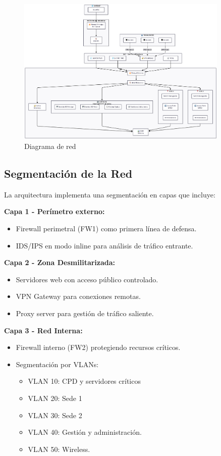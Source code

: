 \documentclass[12pt,letterpaper]{article}
\begin{document}
\begin{figure}[ht]
    \centering
    \includegraphics[width=0.9\textwidth]{./images/diagram.png}
    \caption{Diagrama de red}
    \label{fig:diagrama}
\end{figure}

\subsection{\textcolor{azuloscuro}{Segmentación de la Red}}

La arquitectura implementa una segmentación en capas que incluye:

\noindent\textbf{Capa 1 - Perímetro externo:}
\begin{itemize}
    \item Firewall perimetral (FW1) como primera línea de defensa.
    \item IDS/IPS en modo inline para análisis de tráfico entrante.
\end{itemize}

\noindent\textbf{Capa 2 - Zona Desmilitarizada:}
\begin{itemize}
    \item Servidores web con acceso público controlado.
    \item VPN Gateway para conexiones remotas.
    \item Proxy server para gestión de tráfico saliente.
\end{itemize}

\noindent\textbf{Capa 3 - Red Interna:}
\begin{itemize}
    \item Firewall interno (FW2) protegiendo recursos críticos.
    \item Segmentación por VLANs:
    \begin{itemize}
        \item VLAN 10: CPD y servidores críticos
        \item VLAN 20: Sede 1
        \item VLAN 30: Sede 2
        \item VLAN 40: Gestión y administración.
        \item VLAN 50: Wireless.
    \end{itemize}
\end{itemize}
\end{document}

